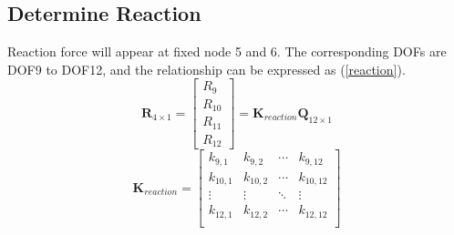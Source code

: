 \documentclass[12pt, a4paper]{article}
\begin{document}
\subsection{Determine Reaction} 
    \qquad Reaction force will appear at fixed node 5 and 6. The corresponding DOFs are DOF9 to DOF12, and the relationship can be expressed as (\ref{reaction}).
    \begin{equation}
        \label{reaction}
        \mathbf{R}_{4\times1}=
        \begin{bmatrix}
           R_{9}\\R_{10}\\R_{11}\\R_{12}
        \end{bmatrix}
        =\mathbf{K}_{reaction}\mathbf{Q}_{12\times1}
    \end{equation}
    \begin{equation*}
        \mathbf{K}_{reaction}=
        \begin{bmatrix}
            k_{9,1} & k_{9,2} & \cdots & k_{9,12} \\
            k_{10,1} & k_{10,2} & \cdots & k_{10,12} \\
            \vdots & \vdots & \ddots & \vdots \\
            k_{12,1} & k_{12,2} & \cdots & k_{12,12} \\
        \end{bmatrix}
    \end{equation*}
\end{document}
